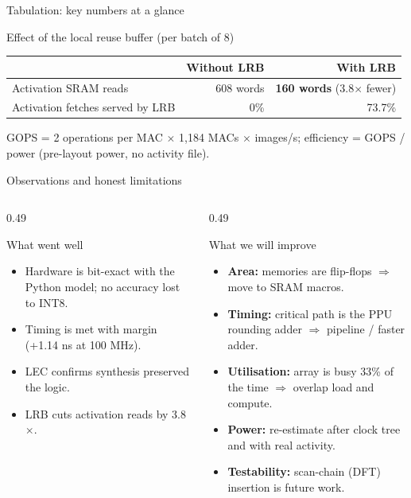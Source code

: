 \documentclass[aspectratio=169,10pt,t]{beamer}
\begin{document}
\begin{frame}{Tabulation: key numbers at a glance}
  \begin{block}{Effect of the local reuse buffer (per batch of 8)}
    \footnotesize
    \begin{tabularx}{\textwidth}{@{}Xrr@{}}
      \toprule
      & \textbf{Without LRB} & \textbf{With LRB}\\
      \midrule
      Activation SRAM reads & 608 words & \textbf{160 words} (3.8$\times$ fewer)\\
      Activation fetches served by LRB & 0\% & 73.7\%\\
      \bottomrule
    \end{tabularx}
  \end{block}
  \tiny GOPS = 2 operations per MAC $\times$ 1,184 MACs $\times$ images/s; efficiency = GOPS / power (pre-layout power, no activity file).
\end{frame}

\begin{frame}{Observations and honest limitations}
  \begin{columns}[T]
    \begin{column}{0.49\textwidth}
      \begin{block}{What went well}
        \footnotesize
        \begin{itemize}\setlength{\itemsep}{2pt}
          \item Hardware is bit-exact with the Python model; no accuracy lost to INT8.
          \item Timing is met with margin (+1.14 ns at 100 MHz).
          \item LEC confirms synthesis preserved the logic.
          \item LRB cuts activation reads by 3.8$\times$.
        \end{itemize}
      \end{block}
    \end{column}
    \begin{column}{0.49\textwidth}
      \begin{block}{What we will improve}
        \footnotesize
        \begin{itemize}\setlength{\itemsep}{2pt}
          \item \textbf{Area:} memories are flip-flops $\Rightarrow$ move to SRAM macros.
          \item \textbf{Timing:} critical path is the PPU rounding adder $\Rightarrow$ pipeline / faster adder.
          \item \textbf{Utilisation:} array is busy 33\% of the time $\Rightarrow$ overlap load and compute.
          \item \textbf{Power:} re-estimate after clock tree and with real activity.
          \item \textbf{Testability:} scan-chain (DFT) insertion is future work.
        \end{itemize}
      \end{block}
    \end{column}
  \end{columns}
\end{frame}
\end{document}
